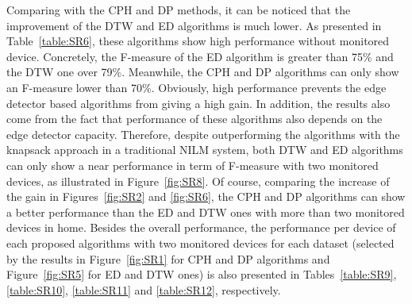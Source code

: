 Comparing with the CPH and DP methods, it can be noticed that the improvement of the DTW and ED algorithms is much lower. As presented in Table~\ref{table:SR6}, these algorithms show high performance without monitored device. Concretely, the F-measure of the ED algorithm is greater than 75$\%$ and the DTW one over 79$\%$. Meanwhile, the CPH and DP algorithms can only show an F-measure lower than 70$\%$. Obviously, high performance prevents the edge detector based algorithms from giving a high gain. In addition, the results also come from the fact that performance of these algorithms also depends on the edge detector capacity. Therefore, despite outperforming the algorithms with the knapsack approach in a traditional NILM system, both DTW and ED algorithms can only show a near performance in term of F-measure with two monitored devices, as illustrated in Figure~\ref{fig:SR8}. Of course, comparing the increase of the gain in Figures~\ref{fig:SR2} and \ref{fig:SR6}, the CPH and DP algorithms can show a better performance than the ED and DTW ones with more than two monitored devices in home.
Besides the overall performance, the performance per device of each proposed algorithms with two monitored devices for each dataset (selected by the results in Figure~\ref{fig:SR1} for CPH and DP algorithms and Figure~\ref{fig:SR5} for ED and DTW ones) is also presented in Tables~\ref{table:SR9}, \ref{table:SR10}, \ref{table:SR11} and \ref{table:SR12}, respectively.

